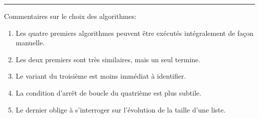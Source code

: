 \documentclass[a4paper,10pt]{article}
\begin{document}
\vspace*{2mm}\hrule\vspace*{2mm}

Commentaires sur le choix des algorithmes:
\begin{enumerate}[label=\alph*)]
\item Les quatre premiers algorithmes peuvent être exécutés intégralement de façon manuelle.
\item Les deux premiers sont très similaires, mais un seul termine.
\item Le variant du troisième est moins immédiat à identifier.
\item La condition d'arrêt de boucle du quatrième est plus subtile. 
\item Le dernier oblige à s'interroger sur l'évolution de la taille d'une liste.
\end{enumerate}
\end{document}
